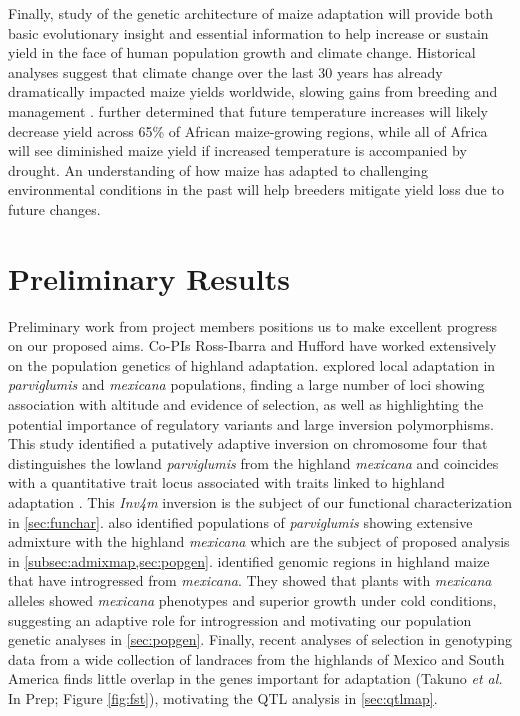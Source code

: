 Finally, study of the genetic architecture of maize adaptation will provide both basic evolutionary insight and essential information to help increase or sustain yield in the face of human population growth and climate change. Historical analyses suggest that climate change over the last 30 years has already dramatically impacted maize yields worldwide, slowing gains from breeding and management \citep{Lobell2011}.  \citet{Lobell2011b} further determined that future temperature increases will likely decrease yield across 65\% of African maize-growing regions, while all of Africa will see diminished maize yield if increased temperature is accompanied by drought.  An understanding of how maize has adapted to challenging environmental conditions in the past will help breeders mitigate yield loss due to future changes.

\section*{Preliminary Results}
Preliminary work from project members positions us to make excellent progress on our proposed aims. Co-PIs Ross-Ibarra and Hufford have worked extensively on the population genetics of highland adaptation.    \citet{Pyhajarvi2013} explored local adaptation in \emph{parviglumis} and \emph{mexicana} populations, finding a large number of loci showing association with altitude and evidence of selection, as well as highlighting the potential importance of regulatory variants and large inversion polymorphisms. This study identified a putatively adaptive inversion on chromosome four that distinguishes the lowland \emph{parviglumis} from the highland \emph{mexicana} and coincides with a quantitative trait locus associated with  traits  linked to highland adaptation \citep{Lauter2004a}. This \emph{Inv4m} inversion is the subject of our functional characterization in \ref{sec:funchar}.  \citet{Pyhajarvi2013} also identified populations of \emph{parviglumis} showing extensive admixture with the highland \emph{mexicana} which are the subject of proposed analysis in \ref{subsec:admixmap,sec:popgen}. \citet{Hufford2013} identified genomic regions in highland maize that have introgressed from \emph{mexicana}.  They showed that  plants with \emph{mexicana} alleles showed \emph{mexicana} phenotypes and superior growth under cold conditions, suggesting an adaptive role for introgression and motivating our population genetic analyses in \ref{sec:popgen}.  Finally, recent analyses of selection in genotyping data from a wide collection of landraces from the highlands of Mexico and South America finds little overlap in the genes important for adaptation (Takuno \emph{et al.} In Prep; Figure \ref{fig:fst}), motivating the QTL analysis in \ref{sec:qtlmap}.

